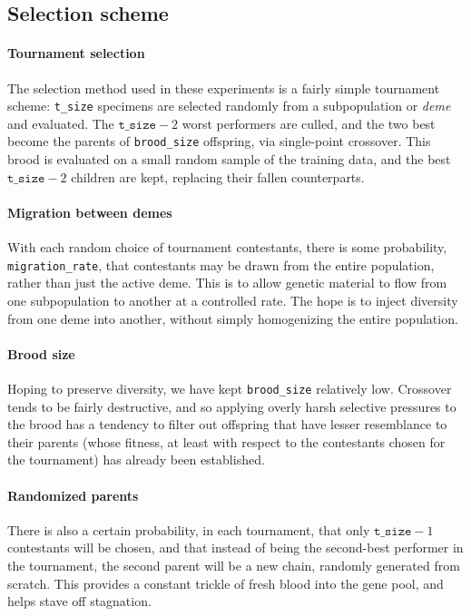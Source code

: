 
\subsection{Selection scheme}

\paragraph{Tournament selection} The selection method used in
these experiments is a fairly simple tournament scheme:
\texttt{t\_size} specimens are selected randomly from a
subpopulation or \emph{deme} and evaluated. The
$\texttt{t\_size}-2$ worst performers are culled, and the two
best become the parents of \texttt{brood\_size} offspring, via
single-point crossover. This brood is evaluated on a small random
sample of the training data, and the best $\texttt{t\_size} - 2$
children are kept, replacing their fallen counterparts. 

\paragraph{Migration between demes}
With each random choice of tournament contestants, there is some
probability, \texttt{migration\_rate}, that contestants may be
drawn from the entire population, rather than just the active
deme. This is to allow genetic material to flow from one
subpopulation to another at a controlled rate. The hope is to
inject diversity from one deme into another, without simply
homogenizing the entire population. 

\paragraph{Brood size}
Hoping to preserve diversity, we have kept \texttt{brood\_size}
relatively low. Crossover tends to be fairly destructive, and so
applying overly harsh selective pressures to the brood has a
tendency to filter out offspring that have lesser resemblance to
their parents (whose fitness, at least with respect to the
contestants chosen for the tournament) has already been
established. 

\paragraph{Randomized parents}
There is also a certain probability, in each tournament, that
only $\texttt{t\_size} - 1$ contestants will be chosen, and that
instead of being the second-best performer in the tournament, the
second parent will be a new chain, randomly generated from
scratch. This provides a constant trickle of fresh blood into the
gene pool, and helps stave off stagnation.

